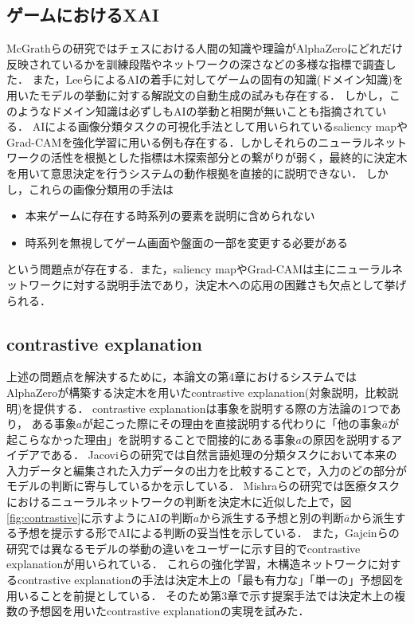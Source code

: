 \subsection{ゲームにおけるXAI}
McGrathらの研究\cite{DeepMind}ではチェスにおける人間の知識や理論がAlphaZeroにどれだけ反映されているかを訓練段階やネットワークの深さなどの多様な指標で調査した．
また，Leeら\cite{ChessComments}によるAIの着手に対してゲームの固有の知識(ドメイン知識)を用いたモデルの挙動に対する解説文の自動生成の試みも存在する．
しかし，このようなドメイン知識は必ずしもAIの挙動と相関が無いことも指摘されている\cite{DeepMind}．
AIによる画像分類タスクの可視化手法として用いられているsaliency map\cite{saliency}やGrad-CAM\cite{Grad-CAM}を強化学習に用いる例も存在する\cite{gl}\cite{atari-saliency}\cite{visualize}．しかしそれらのニューラルネットワークの活性を根拠とした指標は木探索部分との繋がりが弱く，最終的に決定木を用いて意思決定を行うシステムの動作根拠を直接的に説明できない．
しかし，これらの画像分類用の手法は
\begin{itemize}
	\item 本来ゲームに存在する時系列の要素を説明に含められない
	\item 時系列を無視してゲーム画面や盤面の一部を変更する必要がある
\end{itemize}
という問題点が存在する．また，saliency mapやGrad-CAMは主にニューラルネットワークに対する説明手法であり，決定木への応用の困難さも欠点として挙げられる．

\subsection{contrastive explanation}
上述の問題点を解決するために，本論文の第4章におけるシステムではAlphaZeroが構築する決定木を用いたcontrastive explanation(対象説明，比較説明)を提供する．
contrastive explanationは事象を説明する際の方法論の1つであり，
ある事象$a$が起こった際にその理由を直接説明する代わりに「他の事象$\bar{a}$が起こらなかった理由」を説明することで間接的にある事象$a$の原因を説明するアイデアである\cite{contrastive}．
Jacoviらの研究\cite{contrastive}では自然言語処理の分類タスクにおいて本来の入力データと編集された入力データの出力を比較することで，入力のどの部分がモデルの判断に寄与しているかを示している．
Mishraらの研究\cite{whyNot}では医療タスクにおけるニューラルネットワークの判断を決定木に近似した上で，図\ref{fig:contrastive}に示すようにAIの判断$a$から派生する予想と別の判断$\bar{a}$から派生する予想を提示する形でAIによる判断の妥当性を示している．
また，Gajcinらの研究\cite{preference}では異なるモデルの挙動の違いをユーザーに示す目的でcontrastive explanationが用いられている．
これらの強化学習，木構造ネットワークに対するcontrastive explanationの手法は決定木上の「最も有力な」「単一の」予想図を用いることを前提としている．
そのため第3章で示す提案手法では決定木上の複数の予想図を用いたcontrastive explanationの実現を試みた．

